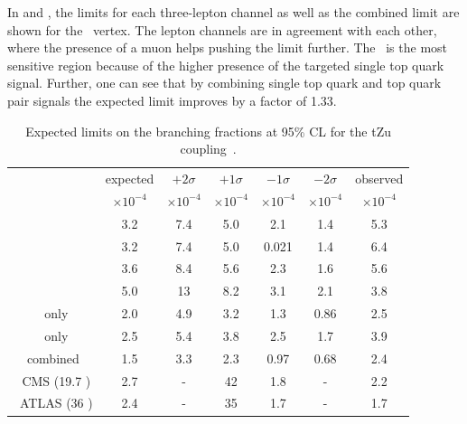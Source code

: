 In  and , the limits for each three-lepton channel as well as the combined limit are shown for the \Zut\ vertex. The lepton channels are in agreement with each other, where the presence of a muon helps pushing the limit further. The \STSR\ is the most sensitive region because of the higher presence of the targeted single top quark signal. Further, one can see that by combining single top quark and top quark pair signals the expected limit improves by a factor of 1.33.
\begin{table}[htbp]
	\centering
	\caption{Expected limits on the branching fractions at 95\% CL for the tZu coupling~\cite{Sirunyan:2017kkr,ATLAS-CONF-2017-070}.}
	\begin{tabular}{ccccccc}
		\toprule
		& expected & $+2\sigma$ & $+1\sigma$ & $-1\sigma$ & $-2\sigma$ & observed \\ 
		& $\times 10^{-4}$ & $\times 10^{-4}$ & $\times 10^{-4}$ & $\times 10^{-4}$ & $\times 10^{-4}$ & $\times 10^{-4}$ \\
		\midrule
		\mumumu\ &3.2  & 7.4  & 5.0  & 2.1  &1.4  & 5.3  \\ 
	
		\emumu\ & 3.2  & 7.4  & 5.0  & 0.021  & 1.4  & 6.4  \\ 
		
		\eemu\ & 3.6  & 8.4  & 5.6  & 2.3  & 1.6  & 5.6  \\ 
		
		\eee\ & 5.0  & 13  & 8.2  &3.1  & 2.1  & 3.8  \B \\ 
		\hdashline
		\STSR\ only &2.0  & 4.9  & 3.2  & 1.3  & 0.86  & 2.5   \T\\ 
		
		\TTSR\ only & 2.5  & 5.4  & 3.8  & 2.5  & 1.7  & 3.9  \B \\ 
		\hdashline
		combined & 1.5  & 3.3  & 2.3  & 0.97  & 0.68  & 2.4   \T \B\\ 
		\hdashline
		8 \TeV\ CMS (19.7 \fbinv)   &2.7  & -   & 42  & 1.8  & -  & 2.2   \T\B\\
		\hdashline
		13 \TeV\ ATLAS (36 \fbinv)   & 2.4  & -  &   35  &1.7 & -  & 1.7  \T\\
		
		\bottomrule
	\end{tabular} 
	\label{tab:ResultsTZU}
\end{table}
